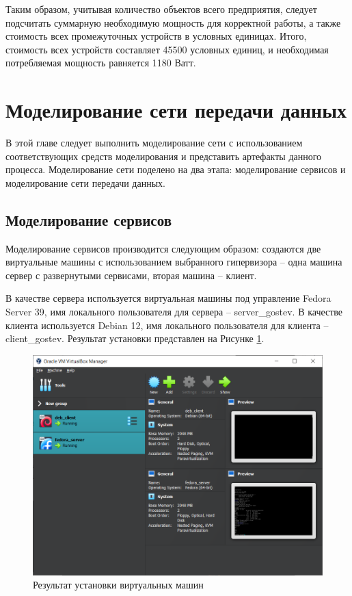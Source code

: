 \documentclass[14pt, a4paper]{extarticle}
\numberwithin{equation}{section}
\begin{document}
Таким образом, учитывая количество объектов всего предприятия, следует
подсчитать суммарную необходимую мощность для корректной работы, а также
стоимость всех промежуточных устройств в условных единицах.
Итого, стоимость всех устройств составляет 45500 условных единиц, и
необходимая потребляемая мощность равняется 1180 Ватт.


\section{Моделирование сети передачи данных}
В этой главе следует выполнить моделирование сети с использованием соответствующих 
средств моделирования и представить артефакты данного процесса. 
Моделирование сети поделено на два этапа: моделирование сервисов и моделирование сети передачи данных. 

\subsection{Моделирование сервисов}
Моделирование сервисов производится следующим образом: 
создаются две виртуальные машины с использованием выбранного гипервизора – 
одна машина сервер с развернутыми сервисами, вторая машина – клиент.

В качестве сервера используется виртуальная машины под управление Fedora Server 39, 
имя локального пользователя для сервера -- server\_gostev.
В качестве клиента используется Debian 12, имя локального пользователя для клиента -- client\_gostev. 
Результат установки представлен на Рисунке \ref{fig:vm_installation}.

\begin{figure}[H]
        \centering
        \includegraphics[scale=0.6]{vm_installation.png}
        \caption{Результат установки виртуальных машин}
        \label{fig:vm_installation}
\end{figure}
\end{document}
